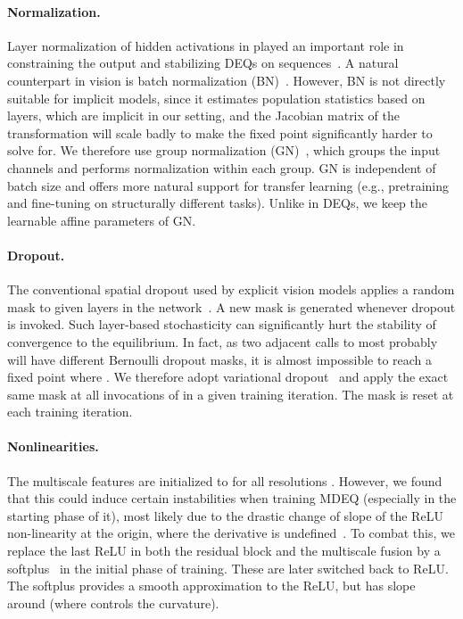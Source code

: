 \documentclass{article}
\begin{document}
\vspace{-.1in}
\paragraph{Normalization.} Layer normalization of hidden activations in  played an important role in constraining the output and stabilizing DEQs on sequences~\cite{bai2019deep}. A natural counterpart in vision is batch normalization (BN)~\cite{ioffe2015batch}. However, BN is not directly suitable for implicit models, since it estimates population statistics based on layers, which are implicit in our setting, and the Jacobian matrix of the transformation  will scale badly to make the fixed point significantly harder to solve for. We therefore use group normalization (GN)~\cite{wu2018group}, which groups the input channels and performs normalization within each group. GN is independent of batch size and offers more natural support for transfer learning (e.g., pretraining and fine-tuning on structurally different tasks). Unlike in DEQs, we keep the learnable affine parameters of GN.

\vspace{-.1in}
\paragraph{Dropout.} The conventional spatial dropout used by explicit vision models applies a random mask to given layers in the network~\cite{srivastava2014dropout}. A new mask is generated whenever dropout is invoked. Such layer-based stochasticity can significantly hurt the stability of convergence to the equilibrium. In fact, as two adjacent calls to  most probably will have different Bernoulli dropout masks, it is almost impossible to reach a fixed point where . We therefore adopt variational dropout~\cite{gal2016dropout} and apply the exact same mask at all invocations of  in a given training iteration. The mask is reset at each training iteration.

\vspace{-.1in}
\paragraph{Nonlinearities.} The multiscale features are initialized to  for all resolutions .
However, we found that this could induce certain instabilities when training MDEQ (especially in the starting phase of it), most likely due to the drastic change of slope of the ReLU non-linearity at the origin, where the derivative is undefined~\cite{glorot2011deep}. To combat this, we replace the last ReLU in both the residual block and the multiscale fusion by a softplus~\cite{glorot2011deep} in the initial phase of training. These are later switched back to ReLU. The softplus provides a smooth approximation to the ReLU, but has slope  around  (where  controls the curvature).
\end{document}
